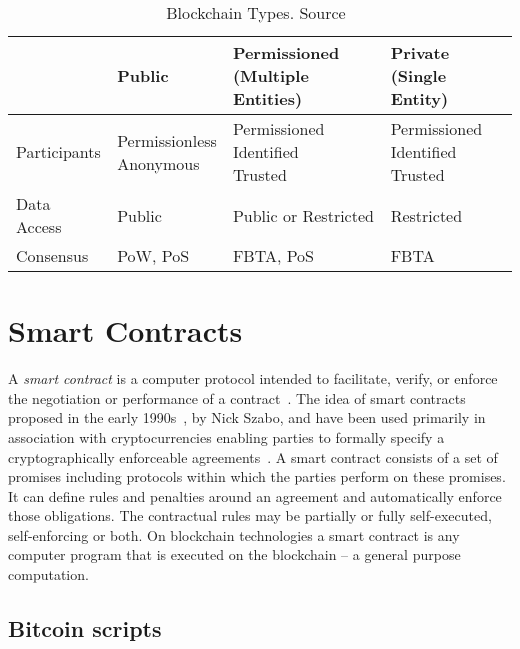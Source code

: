 \begin{table}[!ht]
  \centering
  \caption{Blockchain Types. Source~\cite{hub-bl-types}}
  \begin{tabular}{|l|l|l|l|}
    \hline
     & Public & \makecell[cl]{Permissioned \\ (Multiple Entities)} & \makecell[cl]{Private \\ (Single Entity)} \\ \hline
     Participants & \makecell[cl]{Permissionless \\ Anonymous} & \makecell[cl]{Permissioned \\ Identified \\ Trusted} & \makecell[cl]{Permissioned \\ Identified \\ Trusted} \\ \hline
     Data Access & Public & Public or Restricted & Restricted \\ \hline
     Consensus & PoW, PoS & FBTA, PoS & FBTA \\ \hline
  \end{tabular}
  \label{table:blockchain_types}
\end{table}

\section{Smart Contracts}
\label{smart_contracts}

A \textit{smart contract} is a computer protocol intended to facilitate, verify, or enforce the negotiation or performance of a contract~\cite{FM548,szabo1996smart}.
The idea of smart contracts proposed in the early 1990s~\cite{FM548}, by Nick Szabo, and have been used primarily in association with cryptocurrencies enabling
parties to formally specify a cryptographically enforceable agreements~\cite{7163021}. A smart contract consists of a set of promises including protocols within which the parties perform on these promises. It can define rules and penalties around an agreement and automatically enforce those obligations. The contractual rules may be partially or fully self-executed, self-enforcing or both. On blockchain technologies a smart contract is any computer program that is executed on the blockchain -- a general purpose computation.

\subsection{Bitcoin scripts}
\label{smart_contracts:bitcoin}

